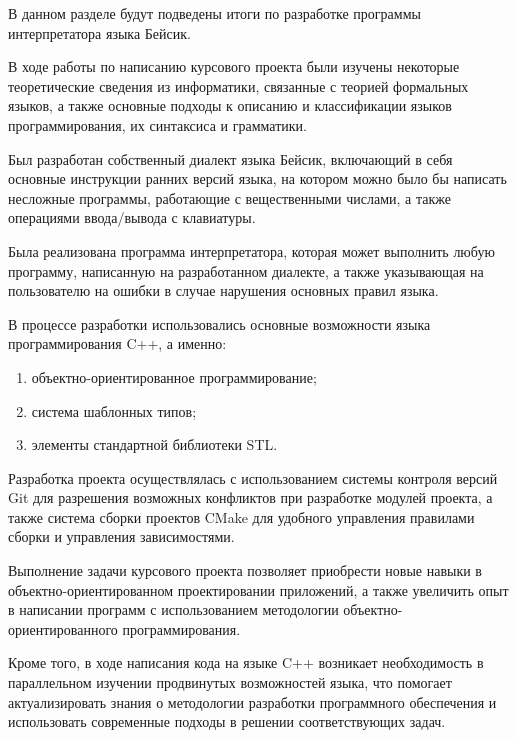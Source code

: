 
В данном разделе будут подведены итоги 
по разработке программы интерпретатора языка Бейсик.

В ходе работы по написанию курсового проекта 
были изучены некоторые теоретические сведения
из информатики, связанные с теорией формальных языков,
а также основные подходы к описанию и классификации
языков программирования, их синтаксиса и грамматики.

Был разработан собственный диалект языка Бейсик, включающий
в себя основные инструкции ранних версий языка,
на котором можно было бы написать несложные программы,
работающие с вещественными числами,
а также операциями ввода/вывода с клавиатуры.

Была реализована программа интерпретатора, которая может
выполнить любую программу, 
написанную на разработанном диалекте,
а также указывающая на пользователю
на ошибки в случае нарушения основных правил языка.

В процессе разработки использовались основные возможности
языка программирования C++, а именно:
\begin{enumerate}
    \item объектно-ориентированное программирование;
    \item система шаблонных типов;
    \item элементы стандартной библиотеки STL.
\end{enumerate}

Разработка проекта осуществлялась с использованием системы
контроля версий Git для разрешения возможных
конфликтов при разработке модулей проекта,
а также система сборки проектов CMake для удобного управления
правилами сборки и управления зависимостями.

Выполнение задачи курсового проекта позволяет приобрести
новые навыки в объектно-ориентированном проектировании
приложений, а также увеличить опыт в написании
программ с использованием методологии объектно-ориентированного
программирования.

Кроме того, в ходе написания кода на языке C++ возникает
необходимость в параллельном изучении продвинутых
возможностей языка, что помогает актуализировать
знания о методологии разработки программного обеспечения
и использовать современные подходы в решении
соответствующих задач.